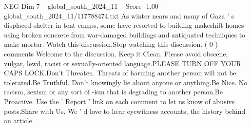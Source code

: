 \begin{textsample}{NEG Dim 7 – global\_south\_2024\_11 – Score -1.00 – global\_south\_2024\_11/117788474.txt}
As winter nears and many of Gaza ' s displaced shelter in tent camps, some have resorted to building makeshift homes using broken concrete from war-damaged buildings and antiquated techniques to make mortar.
Watch this discussion.Stop watching this discussion. ( 0 ) comments Welcome to the discussion.
Keep it Clean.
Please avoid obscene, vulgar, lewd, racist or sexually-oriented language.PLEASE TURN OFF YOUR CAPS LOCK.Don't Threaten.
Threats of harming another person will not be tolerated.Be Truthful.
Don't knowingly lie about anyone or anything.Be Nice.
No racism, sexism or any sort of -ism that is degrading to another person.Be Proactive.
Use the ' Report ' link on each comment to let us know of abusive posts.Share with Us.
We ' d love to hear eyewitness accounts, the history behind an article.

\end{textsample}
